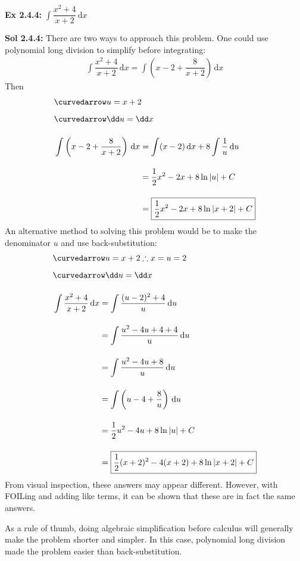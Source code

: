 \begin{tcolorbox}[example]
    \textbf{Ex 2.4.4: } $\int \dfrac{x^2 + 4}{x + 2} \,\mathrm{d}x$
\end{tcolorbox}
\begin{tcolorbox}[solution]
    \textbf{Sol 2.4.4: } There are two ways to approach this problem. One could use polynomial long division to simplify before integrating: \begin{align*}
        \int \dfrac{x^2 + 4}{x + 2} \,\mathrm{d}x = \int \left(x - 2 + \dfrac{8}{x + 2}\right) \,\mathrm{d}x
    \end{align*}
    Then \begin{align*}
        & \curvedarrow u = x + 2 \\[5.5pt]
        & \curvedarrow \dd u = \dd x \\[11pt]
        & \int \left(x - 2 + \dfrac{8}{x + 2}\right) \,\mathrm{d}x \begin{aligned}[t]
            & = \int (x - 2) \,\mathrm{d}x + 8\int \dfrac{1}{u} \,\mathrm{d}u \\[11pt]
            & = \dfrac{1}{2}x^2 - 2x + 8\ln |u| + C \\[11pt]
            & = \boxed{\dfrac{1}{2}x^2 - 2x + 8\ln |x + 2| + C}
        \end{aligned}
    \end{align*}
    An alternative method to solving this problem would be to make the denominator $u$ and use back-substitution: \begin{align*}
        & \curvedarrow u = x + 2 \therefore x = u = 2 \\[5.5pt]
        & \curvedarrow \dd u = \dd x \\[11pt]
        & \int \dfrac{x^2 + 4}{x + 2} \,\mathrm{d}x \begin{aligned}[t]
            & = \int \dfrac{(u - 2)^2 + 4}{u} \,\mathrm{d}u \\[11pt]
            & = \int \dfrac{u^2 - 4u + 4 + 4}{u} \,\mathrm{d}u \\[11pt]
            & = \int \dfrac{u^2 - 4u + 8}{u} \,\mathrm{d}u \\[11pt]
            & = \int \left(u - 4 + \dfrac{8}{u}\right) \,\mathrm{d}u \\[11pt]
            & = \dfrac{1}{2}u^2 - 4u + 8\ln |u| + C \\[11pt]
            & = \boxed{\dfrac{1}{2}(x + 2)^2 - 4(x + 2) + 8\ln |x + 2| + C}
        \end{aligned}
    \end{align*}
    From visual inspection, these answers may appear different. However, with FOILing and adding like terms, it can be shown that these are in fact the same answers. \par
    \vspace{11pt}
    As a rule of thumb, doing algebraic simplification before calculus will generally make the problem shorter and simpler. In this case, polynomial long division made the problem easier than back-substitution.
\end{tcolorbox}

